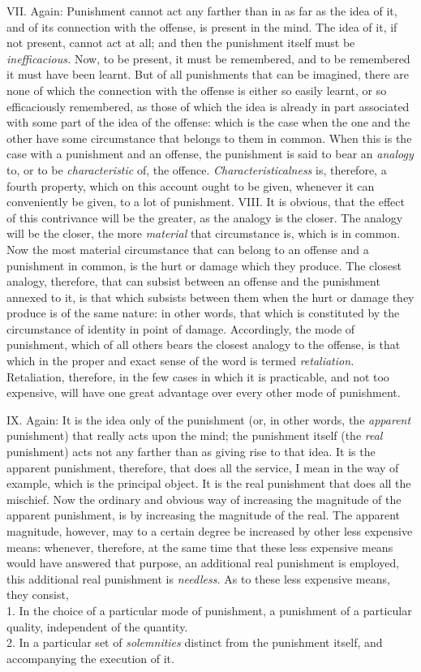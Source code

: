\documentclass[12pt]{report}
\begin{document}
VII. Again: Punishment cannot act any farther than in as far as the idea
of it, and of its connection with the offense, is present in the mind.
The idea of it, if not present, cannot act at all; and then the
punishment itself must be \emph{inefficacious.} Now, to be present, it
must be remembered, and to be remembered it must have been learnt. But
of all punishments that can be imagined, there are none of which the
connection with the offense is either so easily learnt, or so
efficaciously remembered, as those of which the idea is already in part
associated with some part of the idea of the offense: which is the case
when the one and the other have some circumstance that belongs to them
in common. When this is the case with a punishment and an offense, the
punishment is said to bear an \emph{analogy} to, or to be
\emph{characteristic} of, the offence. \emph{Characteristicalness} is,
therefore, a fourth property, which on this account ought to be given,
whenever it can conveniently be given, to a lot of punishment. VIII. It
is obvious, that the effect of this contrivance will be the greater, as
the analogy is the closer. The analogy will be the closer, the more
\emph{material} that circumstance is, which is in common. Now the most
material circumstance that can belong to an offense and a punishment in
common, is the hurt or damage which they produce. The closest analogy,
therefore, that can subsist between an offense and the punishment
annexed to it, is that which subsists between them when the hurt or
damage they produce is of the same nature: in other words, that which is
constituted by the circumstance of identity in point of damage.
Accordingly, the mode of punishment, which of all others bears the
closest analogy to the offense, is that which in the proper and exact
sense of the word is termed \emph{retaliation.} Retaliation, therefore,
in the few cases in which it is practicable, and not too expensive, will
have one great advantage over every other mode of punishment.

IX. Again: It is the idea only of the punishment (or, in other words,
the \emph{apparent} punishment) that really acts upon the mind; the
punishment itself (the \emph{real} punishment) acts not any farther than
as giving rise to that idea. It is the apparent punishment, therefore,
that does all the service, I mean in the way of example, which is the
principal object. It is the real punishment that does all the mischief.
Now the ordinary and obvious way of increasing the magnitude of the
apparent punishment, is by increasing the magnitude of the real. The
apparent magnitude, however, may to a certain degree be increased by
other less expensive means: whenever, therefore, at the same time that
these less expensive means would have answered that purpose, an
additional real punishment is employed, this additional real punishment
is \emph{needless.} As to these less expensive means, they consist,\\
1. In the choice of a particular mode of punishment, a punishment of a
particular quality, independent of the quantity.\\
2. In a particular set of \emph{solemnities} distinct from the
punishment itself, and accompanying the execution of it.
\end{document}
